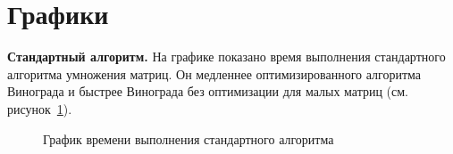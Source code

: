 \begin{table}[H]
	\caption{Результаты замеров процессорного времени (нечётная серия размеров)}
	\label{table_odd}
	\tiny
	\begin{center}
	\end{center}
\end{table}

\section{Графики}

\textbf{Стандартный алгоритм.}  
На графике показано время выполнения стандартного алгоритма умножения матриц. Он медленнее оптимизированного алгоритма Винограда и быстрее Винограда без оптимизации для малых матриц (см. рисунок~\ref{pic_standard}).

\begin{figure}[H]
	\caption{График времени выполнения стандартного алгоритма}
	\label{pic_standard}
\end{figure}

